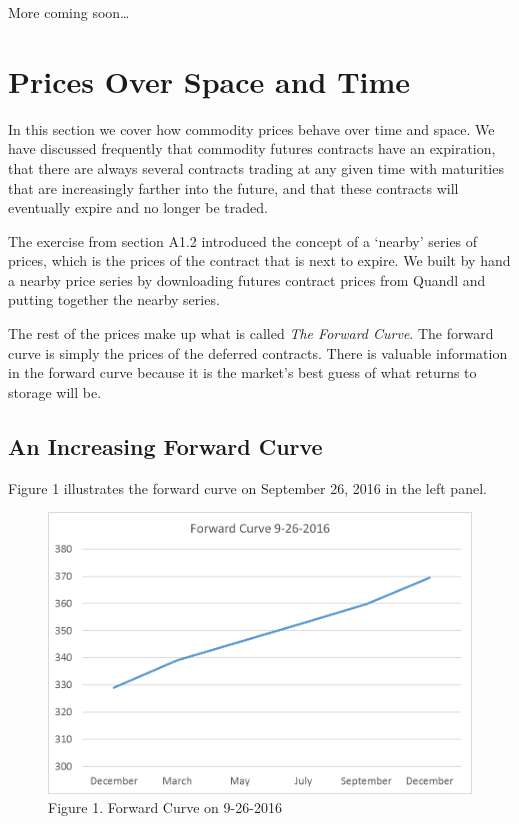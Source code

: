 \documentclass[]{book}
\theoremstyle{definition}
\theoremstyle{definition}
\theoremstyle{remark}
\begin{document}
More coming soon\ldots{}

\chapter{Prices Over Space and Time}\label{prices-over-space-and-time}

In this section we cover how commodity prices behave over time and
space. We have discussed frequently that commodity futures contracts
have an expiration, that there are always several contracts trading at
any given time with maturities that are increasingly farther into the
future, and that these contracts will eventually expire and no longer be
traded.

The exercise from section A1.2 introduced the concept of a `nearby'
series of prices, which is the prices of the contract that is next to
expire. We built by hand a nearby price series by downloading futures
contract prices from Quandl and putting together the nearby series.

The rest of the prices make up what is called \emph{The Forward Curve}.
The forward curve is simply the prices of the deferred contracts. There
is valuable information in the forward curve because it is the market's
best guess of what returns to storage will be.

\section{An Increasing Forward Curve}\label{an-increasing-forward-curve}

Figure 1 illustrates the forward curve on September 26, 2016 in the left
panel.

\begin{figure}[htbp]
\centering
\includegraphics{Excel-files/PricesSpaceTime/forward-curves_files/image001.png}
\caption{Figure 1. Forward Curve on 9-26-2016}
\end{figure}
\end{document}
